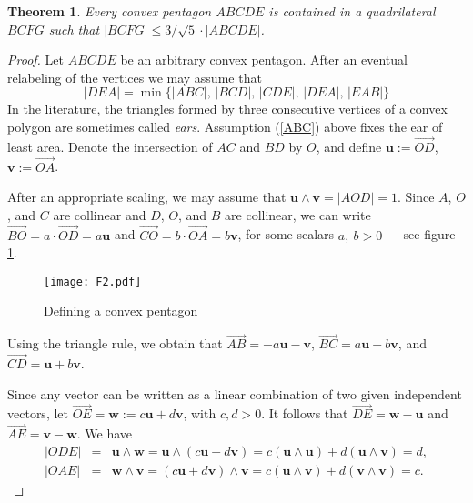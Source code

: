 \documentclass [10pt,oneside]{amsart}
\theoremstyle{definition}
\theoremstyle{plain}
\newtheorem{thm}[df]{Theorem}
\begin{document}
\begin{thm}\label{thmpentagon}
Every convex pentagon $ABCDE$ is contained in a quadrilateral $BCFG$ such that $|BCFG| \le 3/\sqrt{5}\cdot |ABCDE|$.
\end{thm}
\begin{proof}
Let $ABCDE$ be an arbitrary convex pentagon.
After an eventual relabeling of the vertices we may assume that
\begin{equation}\label{ABC}
|DEA|=\min\{|ABC|,\, |BCD|,\, |CDE|,\,
|DEA|,\, |EAB|\}
\end{equation}
In the literature, the triangles formed by three consecutive
vertices of a convex polygon are sometimes called \emph{ears}.
Assumption (\ref {ABC}) above fixes the ear of least area. Denote
the intersection of $AC$ and $BD$ by $O$, and define $\mathbf{u}
:= \overrightarrow{OD}$, $\mathbf{v} := \overrightarrow{OA}$.

After an appropriate scaling, we may assume that $\mathbf{u}\wedge
\mathbf{v} = |AOD| = 1$. Since $A$, $O$, and $C$ are
collinear and $D$, $O$, and $B$ are collinear, we can write
$\overrightarrow{BO} = a \cdot \overrightarrow{OD} = a \mathbf{u}$
and $\overrightarrow{CO} = b \cdot \overrightarrow{OA} = b
\mathbf{v}$, for some scalars $a,\ b > 0$ --- see figure \ref{fig2}.

\begin{figure}[ht]
\centering
\texttt{[image: F2.pdf]}
\vspace{-0.5cm}
\caption{\small{Defining a convex pentagon}}
\label{fig2}
\end{figure}

\noindent Using the triangle rule, we obtain that
$\overrightarrow{AB} = -a\mathbf{u}-\mathbf{v}$,
$\overrightarrow{BC} = a\mathbf{u} - b\mathbf{v}$, and
$\overrightarrow{CD} = \mathbf{u}+b\mathbf{v} $.

Since any vector can be written as a linear combination of two given independent vectors,
let $\overrightarrow{OE} = \mathbf{w} := c \mathbf{u} + d \mathbf{v}$, with $c, d>0$.
It follows that $\overrightarrow{DE} = \mathbf{w} - \mathbf{u}$
and $\overrightarrow{AE} = \mathbf{v} - \mathbf{w}$. We have
\begin{eqnarray*}
|ODE| &=& \mathbf{u}\wedge \mathbf{w} =
\mathbf{u}\wedge (c\mathbf{u} + d\mathbf{v}) = c(\mathbf{u}\wedge \mathbf{u}) + d (\mathbf{u}\wedge\mathbf{v}) = d,\\
|OAE|&=& \mathbf{w}\wedge \mathbf{v} =
(c\mathbf{u} + d\mathbf{v})\wedge \mathbf{v} = c(\mathbf{u}\wedge \mathbf{v}) + d (\mathbf{v}\wedge \mathbf{v}) = c.
\end{eqnarray*}


\end{proof}
\end{document}
